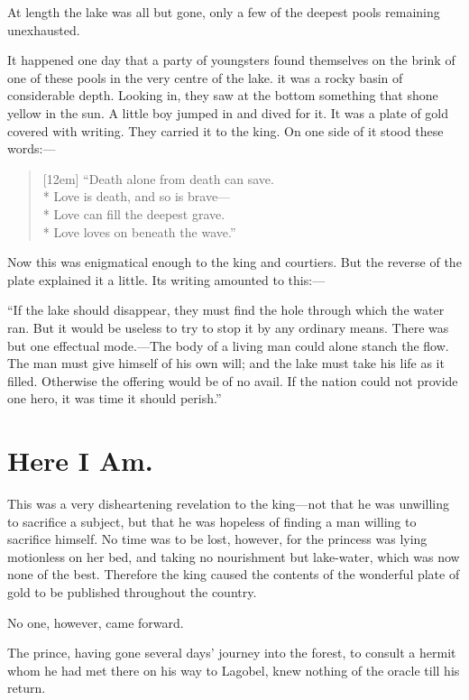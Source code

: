 \documentclass[12pt]{memoir}
\begin{document}
At length the lake was all but gone, only a few of the deepest
pools remaining unexhausted.

It happened one day that a party of youngsters found themselves on the
brink of one of these pools in the very centre of the lake.  it was a
rocky basin of considerable depth.  Looking in, they saw at the bottom
something that shone yellow in the sun.  A little boy jumped in and
dived for it.  It was a plate of gold covered with writing.  They
carried it to the king.  On one side of it stood these words:---

\begin{itshape}
\begin{verse}[12em]
``Death alone from death can save.\\*
Love is death, and so is brave---\\*
Love can fill the deepest grave.\\*
Love loves on beneath the wave.''
\end{verse}
\end{itshape}

Now this was enigmatical enough to the king and courtiers.  But the
reverse of the plate explained it a little.  Its writing amounted to
this:---

``If the lake should disappear, they must find the hole through which
the water ran.  But it would be useless to try to stop it by any
ordinary means.  There was but one effectual mode.---The body of a
living man could alone stanch the flow.  The man must give himself of
his own will; and the lake must take his life as it filled.  Otherwise
the offering would be of no avail.  If the nation could not provide
one hero, it was time it should perish.''


\chapter{Here I Am.}


This was a very disheartening revelation to the king---not that he was
unwilling to sacrifice a subject, but that he was hopeless of finding
a man willing to sacrifice himself.  No time was to be lost, however,
for the princess was lying motionless on her bed, and taking no
nourishment but lake-water, which was now none of the best.  Therefore
the king caused the contents of the wonderful plate of gold to be
published throughout the country.

No one, however, came forward.

The prince, having gone several days' journey into the forest, to
consult a hermit whom he had met there on his way to Lagobel, knew
nothing of the oracle till his return.
\end{document}
